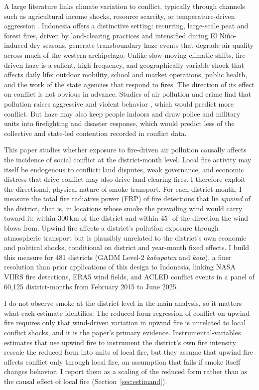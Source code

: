 \documentclass[12pt]{article}
\begin{document}
A large literature links climate variation to conflict, typically through channels such as agricultural income shocks, resource scarcity, or temperature-driven aggression \citep{hsiang2013quantifying}. Indonesia offers a distinctive setting: recurring, large-scale peat and forest fires, driven by land-clearing practices and intensified during El Ni\~{n}o-induced dry seasons, generate transboundary haze events that degrade air quality across much of the western archipelago. Unlike slow-moving climatic shifts, fire-driven haze is a salient, high-frequency, and geographically variable shock that affects daily life: outdoor mobility, school and market operations, public health, and the work of the state agencies that respond to fires. The direction of its effect on conflict is not obvious in advance. Studies of air pollution and crime find that pollution raises aggressive and violent behavior \citep{herrnstadt2021, burkhardt2019}, which would predict more conflict. But haze may also keep people indoors and draw police and military units into firefighting and disaster response, which would predict less of the collective and state-led contention recorded in conflict data.

This paper studies whether exposure to fire-driven air pollution causally affects the incidence of social conflict at the district-month level. Local fire activity may itself be endogenous to conflict: land disputes, weak governance, and economic distress that drive conflict may also drive land-clearing fires. I therefore exploit the directional, physical nature of smoke transport. For each district-month, I measure the total fire radiative power (FRP) of fire detections that lie \emph{upwind} of the district, that is, in locations whose smoke the prevailing wind would carry toward it: within 300\,km of the district and within $45^{\circ}$ of the direction the wind blows from. Upwind fire affects a district's pollution exposure through atmospheric transport but is plausibly unrelated to the district's own economic and political shocks, conditional on district and year-month fixed effects. I build this measure for 481 districts (GADM Level-2 \emph{kabupaten} and \emph{kota}), a finer resolution than prior applications of this design to Indonesia, linking NASA VIIRS fire detections, ERA5 wind fields, and ACLED conflict events in a panel of 60,125 district-months from February 2015 to June 2025.

I do not observe smoke at the district level in the main analysis, so it matters what each estimate identifies. The reduced-form regression of conflict on upwind fire requires only that wind-driven variation in upwind fire is unrelated to local conflict shocks, and it is the paper's primary evidence. Instrumental-variables estimates that use upwind fire to instrument the district's own fire intensity rescale the reduced form into units of local fire, but they assume that upwind fire affects conflict only through local fire, an assumption that fails if smoke itself changes behavior. I report them as a scaling of the reduced form rather than as the causal effect of local fire (Section~\ref{sec:estimand}).
\end{document}
